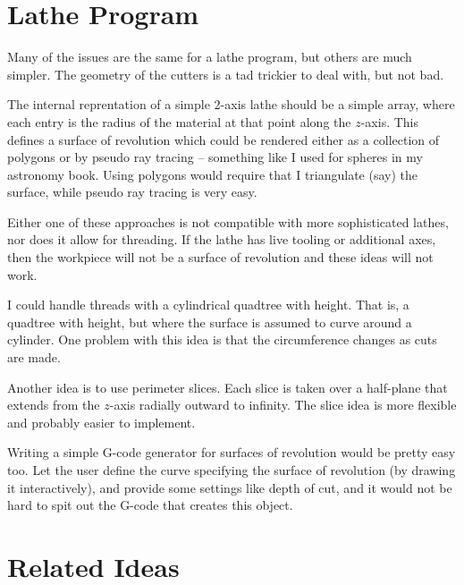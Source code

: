 \documentclass[titlepage,oneside,10pt]{article}
\begin{document}
\section{Lathe Program}

Many of the issues are the same for a lathe program, but others are
much simpler. The geometry of the cutters is a tad trickier to deal
with, but not bad. 

The internal reprentation of a simple 2-axis lathe should be a simple
array, where each entry is the radius of the material at that point
along the $z$-axis. This defines a surface of revolution which could
be rendered either as a collection of polygons or by pseudo ray
tracing -- something like I used for spheres in my astronomy book. Using
polygons would require that I triangulate (say) the surface, while
pseudo ray tracing is very easy.

Either one of these approaches is not compatible with more
sophisticated lathes, nor does it allow for threading. If the lathe
has live tooling or additional axes, then the workpiece will not be a
surface of revolution and these ideas will not work.

I could handle threads with a cylindrical quadtree with height. That
is, a quadtree with height, but where the surface is assumed to curve
around a cylinder. One problem with this idea is that the circumference
changes as cuts are made. 

Another idea is to use perimeter slices. Each slice is taken over a
half-plane that extends from the $z$-axis radially outward to
infinity. The slice idea is more flexible and probably easier to
implement.

Writing a simple G-code generator for surfaces of revolution would be
pretty easy too. Let the user define the curve specifying the
surface of revolution (by drawing it interactively), and provide some settings
like depth of cut, and it would not be hard to spit out the G-code
that creates this object.

\section{Related Ideas}
\end{document}
